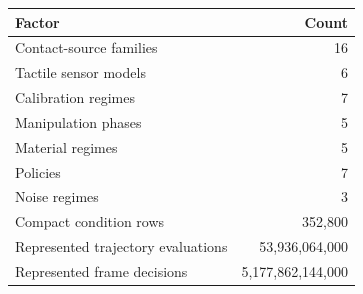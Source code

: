 \begin{tabular}{lr}
\toprule
Factor & Count \\
\midrule
Contact-source families & 16 \\
Tactile sensor models & 6 \\
Calibration regimes & 7 \\
Manipulation phases & 5 \\
Material regimes & 5 \\
Policies & 7 \\
Noise regimes & 3 \\
Compact condition rows & 352,800 \\
Represented trajectory evaluations & 53,936,064,000 \\
Represented frame decisions & 5,177,862,144,000 \\
\bottomrule
\end{tabular}
